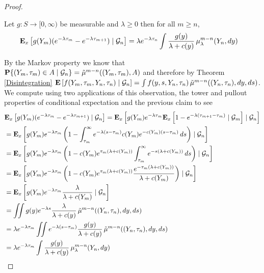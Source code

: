 \begin{proof}
\begin{clm}\label{PureJumpTypeConstruction:Computation1}Let $g : S \to [0,\infty)$ be measurable and $\lambda \geq 0$ then for all $m \geq n$,
\begin{align*}
\csexpectationlong{\mathcal{G}_n}{g(Y_m) (e^{-\lambda \tau_m} - e^{-\lambda \tau_{m+1}})}{x} 
&=\lambda e^{-\lambda \tau_n} \int  \frac{g(y)}{\lambda + c(y)} \, \mu_\lambda^{m-n}(Y_n, dy)
\end{align*}
\end{clm}
By the Markov property we know that $\cprobability{\mathcal{G}_n}{(Y_m, \tau_m) \in A} = \tilde{\mu}^{m-n}((Y_m, \tau_m), A)$ and therefore
by Theorem \ref{Disintegration} $\cexpectationlong{\mathcal{G}_n}{f(Y_m, \tau_m, Y_n, \tau_n)} = \int f(y,s, Y_n, \tau_n) \, \tilde{\mu}^{m-n}((Y_n,\tau_n), dy, ds)$.  We compute using
two applications of this observation, the tower and pullout properties of conditional expectation and the previous claim to see
\begin{align*}
&\csexpectationlong{\mathcal{G}_n}{g(Y_m) (e^{-\lambda \tau_m} - e^{-\lambda \tau_{m+1}})}{x} 
= \csexpectationlong{\mathcal{G}_n}{g(Y_m) e^{-\lambda \tau_m} \csexpectationlong{\mathcal{G}_m} {1 - e^{-\lambda ( \tau_{m+1} - \tau_m)}}{x}}{x} \\
&= \csexpectationlong{\mathcal{G}_n}{g(Y_m) e^{-\lambda \tau_m} \left ( 1 - \int_{\tau_m}^\infty  e^{-\lambda(s - \tau_m)} c(Y_m) e^{-c(Y_m)(s - \tau_m)} \, ds \right ) }{x} \\
&= \csexpectationlong{\mathcal{G}_n}{g(Y_m) e^{-\lambda \tau_m} \left ( 1 -  c(Y_m)  e^{\tau_m(\lambda + c(Y_m))} \int_{\tau_m}^\infty  e^{-s(\lambda + c(Y_m))} \, ds \right ) }{x} \\
&= \csexpectationlong{\mathcal{G}_n}{g(Y_m) e^{-\lambda \tau_m} \left ( 1 -  c(Y_m)  e^{\tau_m(\lambda + c(Y_m))} \frac{e^{-\tau_m (\lambda + c(Y_m))}}{\lambda + c(Y_m)} \right ) }{x} \\
&= \csexpectationlong{\mathcal{G}_n}{g(Y_m) e^{-\lambda \tau_m} \frac{\lambda}{\lambda + c(Y_m)} }{x} \\
&=\iint g(y) e^{-\lambda s} \frac{\lambda}{\lambda + c(y)} \, \tilde{\mu}^{m-n}((Y_n, \tau_n), dy, ds) \\
&=\lambda e^{-\lambda \tau_m} \iint e^{-\lambda (s- \tau_m)} \frac{g(y)}{\lambda + c(y)} \, \tilde{\mu}^{m-n}((Y_n, \tau_n), dy, ds) \\
&=\lambda e^{-\lambda \tau_m} \int \frac{ g(y)}{\lambda + c(y)} \, \mu_\lambda^{m-n}(Y_n, dy) \\
\end{align*}


\end{proof}
